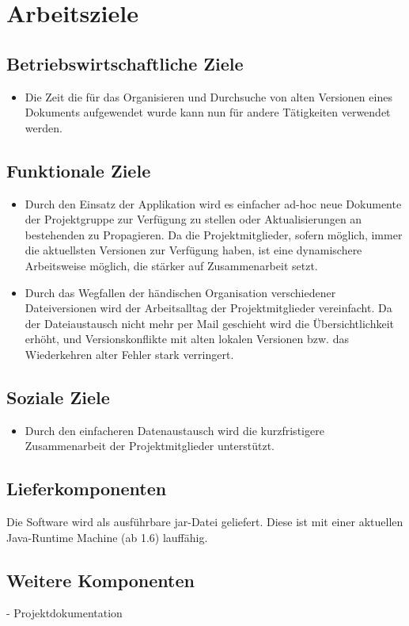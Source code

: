 
\section{Arbeitsziele}

\subsection{Betriebswirtschaftliche Ziele}
\begin{itemize}
\item Die Zeit die für das Organisieren und Durchsuche von alten Versionen eines Dokuments aufgewendet wurde kann nun für andere Tätigkeiten verwendet werden.
\end{itemize}

\subsection{Funktionale Ziele}
\begin{itemize}
\item Durch den Einsatz der Applikation wird es einfacher ad-hoc neue Dokumente der Projektgruppe zur Verfügung zu stellen oder Aktualisierungen an bestehenden zu Propagieren. Da die Projektmitglieder, sofern möglich, immer die aktuellsten Versionen zur Verfügung haben, ist eine dynamischere Arbeitsweise möglich, die stärker auf Zusammenarbeit setzt.

\item Durch das Wegfallen der händischen Organisation verschiedener Dateiversionen wird der Arbeitsalltag der Projektmitglieder vereinfacht. Da der Dateiaustausch nicht mehr per Mail geschieht wird die Übersichtlichkeit erhöht, und Versionskonflikte mit alten lokalen Versionen bzw. das Wiederkehren alter Fehler stark verringert.
\end{itemize}

\subsection{Soziale Ziele}
\begin{itemize}
\item Durch den einfacheren Datenaustausch wird die kurzfristigere Zusammenarbeit der Projektmitglieder unterstützt.
\end{itemize}

\subsection{Lieferkomponenten}
Die Software wird als ausführbare jar-Datei geliefert. Diese ist mit einer aktuellen Java-Runtime Machine (ab 1.6) lauffähig.
\subsection{Weitere Komponenten}
 - Projektdokumentation
